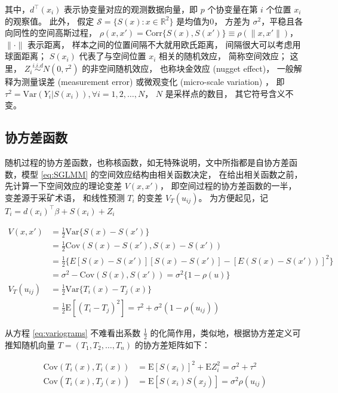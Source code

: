 \documentclass[12pt,a4paper,UTF8,twoside]{book}
\theoremstyle{definition}
\theoremstyle{definition}
\theoremstyle{definition}
\theoremstyle{remark}
\begin{document}
\noindent 其中，\(d^{\top}(x_i)\) 表示协变量对应的观测数据向量，即 \(p\)
个协变量在第 \(i\) 个位置 \(x_i\) 的观察值。 此外， 假定
\(\mathcal{S} = \{S(x): x \in \mathbb{R}^2\}\) 是均值为0， 方差为
\(\sigma^2\)，平稳且各向同性的空间高斯过程，
\(\rho(x,x') = \mathrm{Corr}\{S(x),S(x')\} \equiv \rho(\|x,x'\|)\)，
\(\|\cdot\|\) 表示距离， 样本之间的位置间隔不大就用欧氏距离，
间隔很大可以考虑用球面距离； \(S(x_i)\) 代表了与空间位置 \(x_i\)
相关的随机效应， 简称空间效应； 这里，
\(Z_i \stackrel{i.i.d}{\sim} N(0,\tau^2)\) 的非空间随机效应，
也称块金效应 (nugget effect)， 一般解释为测量误差 (measurement error)
或微观变化 (micro-scale variation) \citep{Christensen2004}， 即
\(\tau^2=\mathrm{Var}(Y_{i}|S(x_{i})),\forall i = 1,2, \ldots, N\)，
\(N\) 是采样点的数目， 其它符号含义不变。

\hypertarget{covariance-function}{%
\subsection{协方差函数}\label{covariance-function}}

随机过程的协方差函数，也称核函数，如无特殊说明，文中所指都是自协方差函数，模型
\eqref{eq:SGLMM} 的空间效应结构由相关函数决定， 在给出相关函数之前，
先计算一下空间效应的理论变差 \(V(x,x')\)，
即空间过程的协方差函数的一半， 变差源于采矿术语， 和线性预测 \(T_{i}\)
的变差 \(V_{T}(u_{ij})\)。 为方便起见，记
\(T_{i} = d(x_i)^{\top}\beta + S(x_i) + Z_i\)

\begin{equation}
\begin{aligned}
V(x,x') 
&= \frac{1}{2}\mathrm{Var}\{S(x)-S(x')\}\\
&= \frac{1}{2}\mathrm{Cov}(S(x)-S(x'),S(x)-S(x'))\\
&= \frac{1}{2}\{E[S(x)-S(x')][S(x)-S(x')]-[E(S(x)-S(x'))]^2\}\\
&= \sigma^2-\mathrm{Cov}(S(x),S(x'))=\sigma^2\{1-\rho(u)\}\\
V_{T}(u_{ij})
&= \frac{1}{2}\mathrm{Var}\{T_{i}(x)-T_{j}(x)\} \\
&= \frac{1}{2}\mathrm{E}[(T_{i}-T_{j})^2]=\tau^2+\sigma^2(1-\rho(u_{ij})) 
\end{aligned} \label{eq:variograms}
\end{equation}

\noindent 从方程 \eqref{eq:variograms} 不难看出系数 \(\frac{1}{2}\)
的化简作用，类似地，根据协方差定义可推知随机向量
\(T = (T_1,T_2,\ldots,T_n)\) 的协方差矩阵如下：

\begin{equation}
\begin{aligned}
\mathrm{Cov}(T_{i}(x),T_{i}(x)) &= \mathrm{E}[S(x_i)]^2 + \mathrm{E}Z_{i}^{2}= \sigma^2+\tau^2 \\
\mathrm{Cov}(T_{i}(x),T_{j}(x)) &= \mathrm{E}[S(x_i)S(x_j)]  = \sigma^2\rho(u_{ij})
\end{aligned}
\end{equation}
\end{document}
